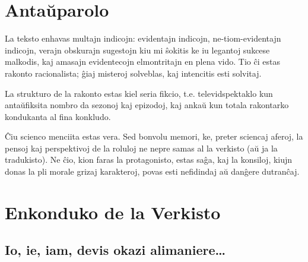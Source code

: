 \chapter*{Antaŭparolo}

La teksto enhavas multajn indicojn: evidentajn indicojn, ne-tiom-evidentajn indicojn, verajn obskurajn sugestojn kiu mi ŝokitis ke iu legantoj sukcese malkodis, kaj amasajn evidentecojn elmontritajn en plena vido.
Tio ĉi estas rakonto racionalista; ĝiaj misteroj solveblas, kaj intencitis esti solvitaj.

La strukturo de la rakonto estas kiel seria fikcio, t.e. televidspektaklo kun antaŭfiksita nombro da sezonoj kaj epizodoj, kaj ankaŭ kun totala rakontarko kondukanta al fina konkludo.


Ĉiu scienco menciita estas vera.
Sed bonvolu memori, ke, preter sciencaj aferoj, la pensoj kaj perspektivoj de la roluloj ne nepre samas al la verkisto (aŭ ja la tradukisto).
Ne ĉio, kion faras la protagonisto, estas saĝa, kaj la konsiloj, kiujn donas la pli morale grizaj karakteroj, povas esti nefidindaj aŭ danĝere dutranĉaj.

\chapter*{Enkonduko de la Verkisto}

\section*{Io, ie, iam, devis okazi alimaniere…}

